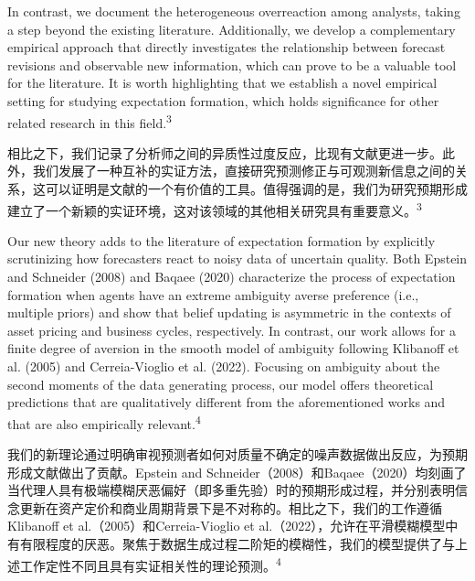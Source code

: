 \documentclass[12pt,a4paper]{article}
\newenvironment{original}
  {\par\medskip\noindent\ignorespaces}
  {\par\medskip}
\newenvironment{translation}
  {\par\noindent{\color{transblue}\ignorespaces}}
  {\par\bigskip}
\begin{document}
\begin{original}
In contrast, we document the heterogeneous overreaction among analysts, taking a step beyond the existing literature. Additionally, we develop a complementary empirical approach that directly investigates the relationship between forecast revisions and observable new information, which can prove to be a valuable tool for the literature. It is worth highlighting that we establish a novel empirical setting for studying expectation formation, which holds significance for other related research in this field.\textsuperscript{3}
\end{original}
\begin{translation}
相比之下，我们记录了分析师之间的异质性过度反应，比现有文献更进一步。此外，我们发展了一种互补的实证方法，直接研究预测修正与可观测新信息之间的关系，这可以证明是文献的一个有价值的工具。值得强调的是，我们为研究预期形成建立了一个新颖的实证环境，这对该领域的其他相关研究具有重要意义。\textsuperscript{3}
\end{translation}

\begin{original}
Our new theory adds to the literature of expectation formation by explicitly scrutinizing how forecasters react to noisy data of uncertain quality. Both Epstein and Schneider (2008) and Baqaee (2020) characterize the process of expectation formation when agents have an extreme ambiguity averse preference (i.e., multiple priors) and show that belief updating is asymmetric in the contexts of asset pricing and business cycles, respectively. In contrast, our work allows for a finite degree of aversion in the smooth model of ambiguity following Klibanoff et al. (2005) and Cerreia-Vioglio et al. (2022). Focusing on ambiguity about the second moments of the data generating process, our model offers theoretical predictions that are qualitatively different from the aforementioned works and that are also empirically relevant.\textsuperscript{4}
\end{original}
\begin{translation}
我们的新理论通过明确审视预测者如何对质量不确定的噪声数据做出反应，为预期形成文献做出了贡献。Epstein and Schneider（2008）和Baqaee（2020）均刻画了当代理人具有极端模糊厌恶偏好（即多重先验）时的预期形成过程，并分别表明信念更新在资产定价和商业周期背景下是不对称的。相比之下，我们的工作遵循Klibanoff et al.（2005）和Cerreia-Vioglio et al.（2022），允许在平滑模糊模型中有有限程度的厌恶。聚焦于数据生成过程二阶矩的模糊性，我们的模型提供了与上述工作定性不同且具有实证相关性的理论预测。\textsuperscript{4}
\end{translation}
\end{document}
